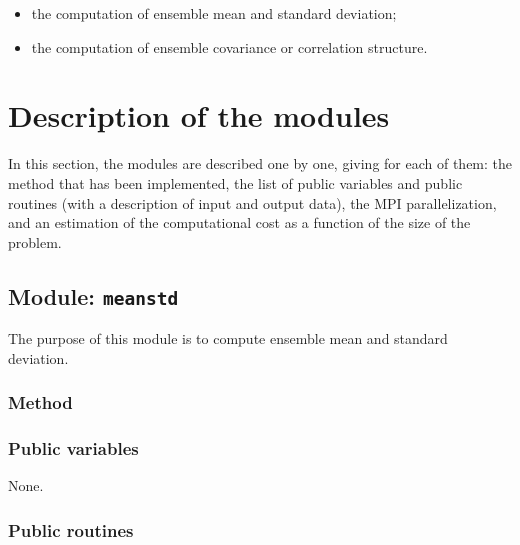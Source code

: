 \documentclass[11pt]{article}
\begin{document}
\begin{itemize}
\item the computation of ensemble mean and standard deviation;
\item the computation of ensemble covariance or correlation structure.
\end{itemize}

\clearpage

\pagestyle{plain}

\section{Description of the modules}

In this section,
the modules are described one by one,
giving for each of them:
the method that has been implemented,
the list of public variables and public routines
(with a description of input and output data),
the MPI parallelization, and
an estimation of the computational cost
as a function of the size of the problem.

\subsection{Module: {\tt\bf meanstd}}

The purpose of this module is to compute
ensemble mean and standard deviation.

\subsubsection*{Method}

\subsubsection*{Public variables}

None.

\subsubsection*{Public routines}
\end{document}
